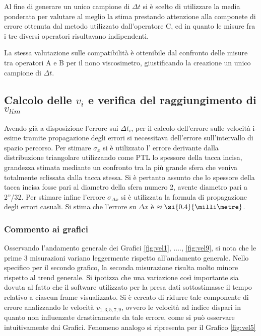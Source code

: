 \documentclass[a4paper,11pt,oneside]{article}
\begin{document}
Al fine di generare un unico campione di $\Delta t$ si è scelto di utilizzare la media ponderata per valutare al meglio la stima prestando attenzione alla componete di errore ottenuta dal metodo utilizzato dall'operatore C, ed in quanto le misure fra i tre diversi operatori risultavano indipendenti.\newline

La stessa valutazione sulle compatibilità è ottenibile dal confronto delle misure tra operatori A e B per il nono viscosimetro, giustificando la creazione un unico campione di $\Delta t$.

\subsection{Calcolo delle $v_i$ e verifica del raggiungimento di $v_{lim}$}
Avendo già a disposizione l'errore sui $\Delta t_{i}$, per il calcolo dell'errore sulle velocità i-esime tramite propagazione degli errori si necessitava dell'errore sull'intervallo di spazio percorso. Per stimare $\sigma_x$ si è utilizzato l' errore derivante dalla distribuzione triangolare utilizzando come PTL lo spessore della tacca incisa, grandezza stimata mediante un confronto tra la più grande sfera che veniva totalmente eclissata dalla tacca stessa. Si è pertanto assunto che lo spessore della tacca incisa fosse pari al diametro della sfera numero 2, avente diametro pari a 2''/32. Per stimare infine l'errore $\sigma_{\Delta x}$ si è utilizzata la formula di propagazione degli errori casuali.  Si stima che l'errore su $\Delta x$ è $\approx \si{0.4}{\milli\metre}$.\\

\subsubsection*{Commento ai grafici}
Osservando l'andamento generale dei Grafici \ref{fig:vel1}, ...., \ref{fig:vel9}, si nota che le prime 3 misurazioni variano leggermente rispetto all'andamento generale. Nello specifico per il secondo grafico, la seconda misurazione risulta molto minore rispetto al trend generale. Si ipotizza che una variazione così importante sia dovuta al fatto che il software utilizzato per la presa dati sottostimasse il tempo relativo a ciascun frame visualizzato.
Si è cercato di ridurre tale componente di errore analizzando le velocità $v_{1, 3, 5, 7, 9}$, ovvero le velocità ad indice dispari in quanto non influenzate drasticamente da tale errore, come si può osservare intuitivamente dai Grafici. Fenomeno analogo si ripresenta per il Grafico \ref{fig:vel5}
\end{document}
